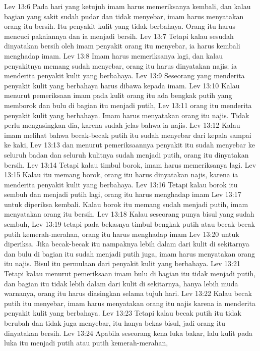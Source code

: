 Lev 13:6  Pada hari yang ketujuh imam harus memeriksanya kembali, dan kalau bagian yang sakit sudah pudar dan tidak menyebar, imam harus menyatakan orang itu bersih. Itu penyakit kulit yang tidak berbahaya. Orang itu harus mencuci pakaiannya dan ia menjadi bersih.
Lev 13:7  Tetapi kalau sesudah dinyatakan bersih oleh imam penyakit orang itu menyebar, ia harus kembali menghadap imam.
Lev 13:8  Imam harus memeriksanya lagi, dan kalau penyakitnya memang sudah menyebar, orang itu harus dinyatakan najis; ia menderita penyakit kulit yang berbahaya.
Lev 13:9  Seseorang yang menderita penyakit kulit yang berbahaya harus dibawa kepada imam.
Lev 13:10  Kalau menurut pemeriksaan imam pada kulit orang itu ada bengkak putih yang memborok dan bulu di bagian itu menjadi putih,
Lev 13:11  orang itu menderita penyakit kulit yang berbahaya. Imam harus menyatakan orang itu najis. Tidak perlu mengasingkan dia, karena sudah jelas bahwa ia najis.
Lev 13:12  Kalau imam melihat bahwa becak-becak putih itu sudah menyebar dari kepala sampai ke kaki,
Lev 13:13  dan menurut pemeriksaannya penyakit itu sudah menyebar ke seluruh badan dan seluruh kulitnya sudah menjadi putih, orang itu dinyatakan bersih.
Lev 13:14  Tetapi kalau timbul borok, imam harus memeriksanya lagi.
Lev 13:15  Kalau itu memang borok, orang itu harus dinyatakan najis, karena ia menderita penyakit kulit yang berbahaya.
Lev 13:16  Tetapi kalau borok itu sembuh dan menjadi putih lagi, orang itu harus menghadap imam
Lev 13:17  untuk diperiksa kembali. Kalau borok itu memang sudah menjadi putih, imam menyatakan orang itu bersih.
Lev 13:18  Kalau seseorang punya bisul yang sudah sembuh,
Lev 13:19  tetapi pada bekasnya timbul bengkak putih atau becak-becak putih kemerah-merahan, orang itu harus menghadap imam
Lev 13:20  untuk diperiksa. Jika becak-becak itu nampaknya lebih dalam dari kulit di sekitarnya dan bulu di bagian itu sudah menjadi putih juga, imam harus menyatakan orang itu najis. Bisul itu permulaan dari penyakit kulit yang berbahaya.
Lev 13:21  Tetapi kalau menurut pemeriksaan imam bulu di bagian itu tidak menjadi putih, dan bagian itu tidak lebih dalam dari kulit di sekitarnya, hanya lebih muda warnanya, orang itu harus diasingkan selama tujuh hari.
Lev 13:22  Kalau becak putih itu menyebar, imam harus menyatakan orang itu najis karena ia menderita penyakit kulit yang berbahaya.
Lev 13:23  Tetapi kalau becak putih itu tidak berubah dan tidak juga menyebar, itu hanya bekas bisul, jadi orang itu dinyatakan bersih.
Lev 13:24  Apabila seseorang kena luka bakar, lalu kulit pada luka itu menjadi putih atau putih kemerah-merahan,
